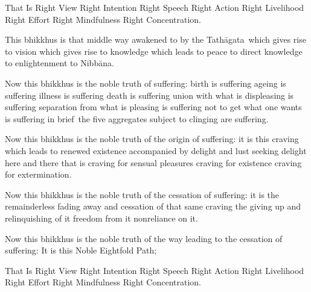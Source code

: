 \medskip

\begin{english-hang}
  That Is Right View Right Intention Right Speech Right Action Right Livelihood Right Effort Right Mindfulness Right Concentration.
\end{english-hang}

\medskip

\begin{english-hang}
  This bhikkhus is that middle way awakened to by the \mbox{Tathāgata}~which gives rise to vision which gives rise to knowledge which leads to peace to direct knowledge to enlightenment to Nibbāna.
\end{english-hang}

\medskip

\begin{english-hang}
  Now this bhikkhus is the noble truth of suffering: birth is suffering ageing is suffering illness is suffering death is suffering union with what is displeasing is suffering separation from what is pleasing is suffering not to get what one wants is suffering in \mbox{brief}~the five aggregates subject to clinging are suffering.
\end{english-hang}

\medskip

\begin{english-hang}
  Now this bhikkhus is the noble truth of the origin of suffering: it is this craving which leads to renewed existence accompanied by delight and lust seeking delight here and there that is craving for sensual pleasures craving for existence craving for extermination.
\end{english-hang}

\medskip

\begin{english-hang}
  Now this bhikkhus is the noble truth of the cessation of suffering: it is the remainderless fading away and cessation of that same craving the giving up and relinquishing of it freedom from it nonreliance on it.
\end{english-hang}

\medskip

\begin{english-hang}
  Now this bhikkhus is the noble truth of the way leading to the cessation of suffering: It is this Noble Eightfold Path;
\end{english-hang}

\medskip

\begin{english-hang}
  That Is Right View Right Intention Right Speech Right Action Right Livelihood Right Effort Right Mindfulness Right Concentration.
\end{english-hang}

